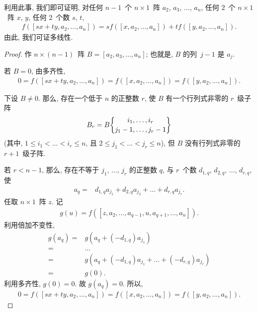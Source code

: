 \documentclass[../libro.tex]{subfiles}
\begin{document}
利用此事, 我们即可证明,
对任何 \(n-1\)~个 \(n \times 1\)~阵
\(a_2\), \(a_3\), \(\dots\), \(a_n\),
任何 \(2\)~个 \(n \times 1\)~阵 \(x\), \(y\),
任何 \(2\)~个数 \(s\), \(t\),
\begin{align*}
    f([sx + ty, a_2, \dots, a_n])
    = s f([x, a_2, \dots, a_n])
    + t f([y, a_2, \dots, a_n]).
\end{align*}
由此, 我们可证多线性.

\begin{proof}
    作 \(n \times (n-1)\)~阵
    \(B = [a_2, a_3, \dots, a_n]\);
    也就是, \(B\) 的列~\(j-1\) 是 \(a_j\).

    若 \(B = 0\),
    由多齐性,
    \begin{align*}
        0 = f([sx + ty, a_2, \dots, a_n])
        = f([x, a_2, \dots, a_n])
        = f([y, a_2, \dots, a_n]).
    \end{align*}

    下设 \(B \neq 0\).
    那么, 存在一个低于 \(n\) 的正整数 \(r\),
    使 \(B\) 有一个行列式非零的 \(r\)~级子阵
    \begin{align*}
        B_r = B\submat{i_1,\dots,i_r}{j_1-1,\dots,j_r-1}
    \end{align*}
    (其中, %
    \(1 \leq i_1 < \dots < i_r \leq n\),
    且 \(2 \leq j_1 < \dots < j_r \leq n\)), %
    但 \(B\) 没有行列式非零的 \(r+1\)~级子阵.

    若 \(r < n-1\), 那么,
    存在不等于
    \(j_1\), \(\dots\), \(j_r\) 的正整数 \(q\),
    与 \(r\)~个数
    \(d_{1,q}\), \(d_{2,q}\), \(\dots\), \(d_{r,q}\),
    使
    \begin{align*}
        a_q
        = {} &
        d_{1,q} a_{j_1}
        + d_{2,q} a_{j_2}
        + \dots
        + d_{r,q} a_{j_r}.
    \end{align*}
    任取 \(n \times 1\)~阵 \(z\).
    记
    \begin{align*}
        g(u)
        = f ([z, a_2, \dots, a_{q-1}, u, a_{q+1}, \dots, a_n]).
    \end{align*}
    利用倍加不变性,
    \begin{align*}
        g(a_q)
        = {} & g(a_q + (-d_{1,q})a_{j_1}) \\
        = {} & \dots                      \\
        = {} & g(a_q + (-d_{1,q})a_{j_1}
        + \dots + (-d_{r,q})a_{j_r})      \\
        = {} & g(0).
    \end{align*}
    利用多齐性, \(g(0) = 0\).
    故 \(g(a_q) = 0\).
    所以,
    \begin{align*}
        0 = f([sx + ty, a_2, \dots, a_n])
        = f([x, a_2, \dots, a_n])
        = f([y, a_2, \dots, a_n]).
    \end{align*}


\end{proof}
\end{document}
